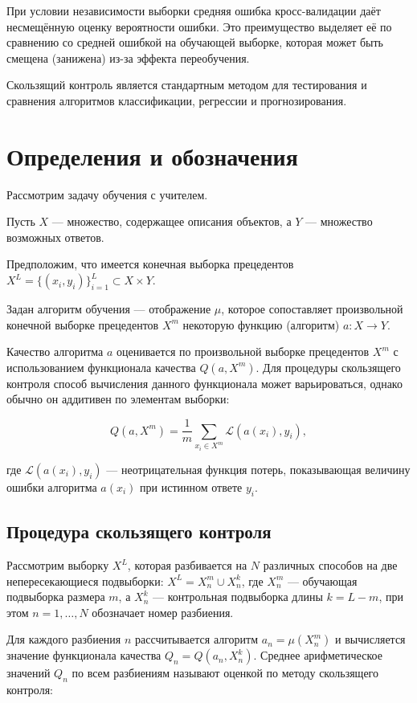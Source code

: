 При условии независимости выборки средняя ошибка кросс-валидации даёт несмещённую оценку вероятности ошибки. Это преимущество выделяет её по сравнению со средней ошибкой на обучающей выборке, которая может быть смещена (занижена) из-за эффекта переобучения.

Скользящий контроль является стандартным методом для тестирования и сравнения алгоритмов классификации, регрессии и прогнозирования.

\section{Определения и обозначения}

Рассмотрим задачу обучения с учителем.

Пусть $X$ — множество, содержащее описания объектов, а $Y$ — множество возможных ответов.

Предположим, что имеется конечная выборка прецедентов $X^L = \{(x_i, y_i)\}_{i=1}^L \subset X \times Y$.

Задан алгоритм обучения — отображение $\mu$, которое сопоставляет произвольной конечной выборке прецедентов $X^m$ некоторую функцию (алгоритм) $a : X \to Y$.

Качество алгоритма $a$ оценивается по произвольной выборке прецедентов $X^m$ с использованием функционала качества $Q(a, X^m)$. Для процедуры скользящего контроля способ вычисления данного функционала может варьироваться, однако обычно он аддитивен по элементам выборки:

\[
    Q(a, X^m) = \frac{1}{m} \sum_{x_i \in X^m} \mathcal{L}(a(x_i), y_i),
\]

где $\mathcal{L}(a(x_i), y_i)$ — неотрицательная функция потерь, показывающая величину ошибки алгоритма $a(x_i)$ при истинном ответе $y_i$.

\subsection{Процедура скользящего контроля}

Рассмотрим выборку $X^L$, которая разбивается на $N$ различных способов на две непересекающиеся подвыборки: $X^L = X^m_n \cup X^k_n$, где $X^m_n$ — обучающая подвыборка размера $m$, а $X^k_n$ — контрольная подвыборка длины $k = L - m$, при этом $n = 1, \ldots, N$ обозначает номер разбиения.

Для каждого разбиения $n$ рассчитывается алгоритм $a_n = \mu(X^m_n)$ и вычисляется значение функционала качества $Q_n = Q(a_n, X^k_n)$. Среднее арифметическое значений $Q_n$ по всем разбиениям называют оценкой по методу скользящего контроля:

